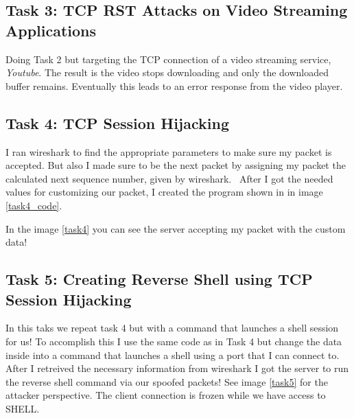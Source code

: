 \documentclass[a4paper]{article}
\begin{document}
\subsection{Task 3: TCP RST Attacks on Video Streaming Applications}
Doing Task 2 but targeting the TCP connection of a video streaming service, \textit{Youtube}. The result is the video stops downloading and only the downloaded buffer remains. Eventually this leads to an error response from the video player.
\subsection{Task 4: TCP Session Hijacking}
I ran wireshark to find the appropriate parameters to make sure my packet is accepted. But also I made sure to be the next packet by assigning my packet the calculated next sequence number, given by wireshark. \
After I got the needed values for customizing our packet, I created the program shown in in image \ref{task4_code}.

In the image \ref{task4} you can see the server accepting my packet with the custom data!
\subsection{Task 5: Creating Reverse Shell using TCP Session Hijacking}
In this taks we repeat task 4 but with a command that launches a shell session for us! To accomplish this I use the same code as in Task 4 but change the data inside into a command that launches a shell using a port that I can connect to. After I retreived the necessary information from wireshark I got the server to run the reverse shell command via our spoofed packets! See image \ref{task5} for the attacker perspective. The client connection is frozen while we have access to SHELL.
\end{document}
